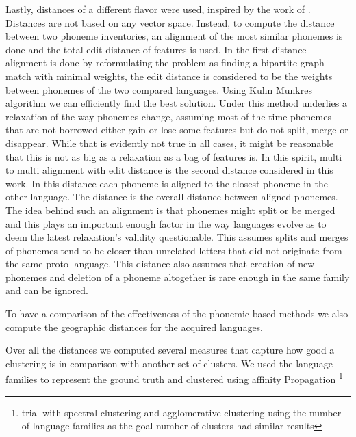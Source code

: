 \documentclass[letterpaper, 11pt]{article}
\begin{document}
Lastly, distances of a different flavor were used, inspired by the work of . Distances are not based on any vector space. Instead, to compute the distance between two phoneme inventories, an alignment of the most similar phonemes is done and the total edit distance of features is used. In the first distance alignment is done by reformulating the problem as finding a bipartite graph match with minimal weights, the edit distance is considered to be the weights between phonemes of the two compared languages. Using Kuhn Munkres algorithm we can efficiently find the best solution. Under this method underlies a relaxation of the way phonemes change, assuming most of the time phonemes that are not borrowed either gain or lose some features but do not split, merge or disappear. While that is evidently not true in all cases, it might be reasonable that this is not as big as a relaxation as a bag of features is.
In this spirit, multi to multi alignment with edit distance is the second distance considered in this work. In this distance each phoneme is aligned to the closest phoneme in the other language. The distance is the overall distance between aligned phonemes. The idea behind such an alignment is that phonemes might split or be merged and this plays an important enough factor in the way languages evolve as to deem the latest relaxation's validity questionable. This assumes splits and merges of phonemes tend to be closer than unrelated letters that did not originate from the same proto language. This distance also assumes that creation of new phonemes and deletion of a phoneme altogether is rare enough in the same family and can be ignored.

To have a comparison of the effectiveness of the phonemic-based methods we also compute the geographic distances for the acquired languages.

Over all the distances we computed several measures that capture how good a clustering is in comparison with another set of clusters. We used the language families to represent the ground truth and clustered using affinity Propagation\cite{frey2007clustering} \footnote{trial with spectral clustering and agglomerative clustering using the number of language families as the goal number of clusters had similar results}
\end{document}
